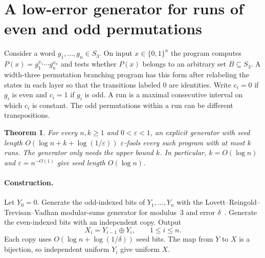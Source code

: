 \documentclass[11pt]{article}
\newtheorem{theorem}{Theorem}
\begin{document}
\section{A low-error generator for runs of even and odd permutations}
\label{sec:s3runs}

Consider a word $g_1,\ldots,g_n\in S_3$. On input $x\in\{0,1\}^n$
the program computes $P(x)=g_1^{x_1}\cdots g_n^{x_n}$ and tests whether
$P(x)$ belongs to an arbitrary set $B\subseteq S_3$. A width-three
permutation branching program has this form after relabeling the states
in each layer so that the transitions labeled $0$ are identities.
Write $c_i=0$ if $g_i$ is even and $c_i=1$ if $g_i$ is odd. A run is
a maximal consecutive interval on which $c_i$ is constant. The odd
permutations within a run can be different transpositions.

\begin{theorem}
For every $n,k\ge 1$ and $0<\varepsilon<1$, an explicit generator with
seed length $O(\log n+k+\log(1/\varepsilon))$ $\varepsilon$-fools every
such program with at most $k$ runs. The generator only needs the upper
bound $k$. In particular, $k=O(\log n)$ and
$\varepsilon=n^{-O(1)}$ give seed length $O(\log n)$.
\end{theorem}

\paragraph{Construction.}
Let $Y_0=0$. Generate the odd-indexed bits of $Y_1,\ldots,Y_n$ with
the Lovett--Reingold--Trevisan--Vadhan modular-sums generator for
modulus~$3$ and error $\delta$~\cite{LRTV}. Generate the even-indexed
bits with an independent copy. Output
\[
    X_i=Y_{i-1}\oplus Y_i,\qquad 1\le i\le n.
\]
Each copy uses $O(\log n+\log(1/\delta))$ seed bits. The map from $Y$
to $X$ is a bijection, so independent uniform $Y_i$ give uniform $X$.
\end{document}
